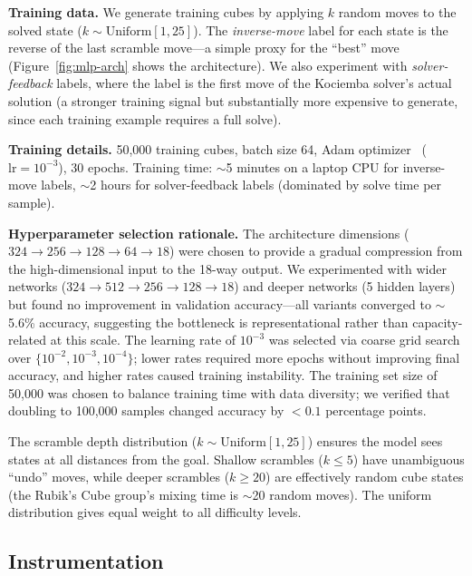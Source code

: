 \documentclass[conference]{IEEEtran}
\begin{document}
\textbf{Training data.} We generate training cubes by applying $k$ random moves to the solved state ($k \sim \text{Uniform}[1, 25]$). The \emph{inverse-move} label for each state is the reverse of the last scramble move---a simple proxy for the ``best'' move (Figure~\ref{fig:mlp-arch} shows the architecture). We also experiment with \emph{solver-feedback} labels, where the label is the first move of the Kociemba solver's actual solution (a stronger training signal but substantially more expensive to generate, since each training example requires a full solve).

\textbf{Training details.} 50,000 training cubes, batch size 64, Adam optimizer~\cite{kingma2015} ($\text{lr} = 10^{-3}$), 30 epochs. Training time: $\sim$5 minutes on a laptop CPU for inverse-move labels, $\sim$2 hours for solver-feedback labels (dominated by solve time per sample).

\textbf{Hyperparameter selection rationale.} The architecture dimensions ($324 \to 256 \to 128 \to 64 \to 18$) were chosen to provide a gradual compression from the high-dimensional input to the 18-way output. We experimented with wider networks ($324 \to 512 \to 256 \to 128 \to 18$) and deeper networks (5 hidden layers) but found no improvement in validation accuracy---all variants converged to $\sim$5.6\% accuracy, suggesting the bottleneck is representational rather than capacity-related at this scale. The learning rate of $10^{-3}$ was selected via coarse grid search over $\{10^{-2}, 10^{-3}, 10^{-4}\}$; lower rates required more epochs without improving final accuracy, and higher rates caused training instability. The training set size of 50,000 was chosen to balance training time with data diversity; we verified that doubling to 100,000 samples changed accuracy by $< 0.1$ percentage points.

The scramble depth distribution ($k \sim \text{Uniform}[1, 25]$) ensures the model sees states at all distances from the goal. Shallow scrambles ($k \leq 5$) have unambiguous ``undo'' moves, while deeper scrambles ($k \geq 20$) are effectively random cube states (the Rubik's Cube group's mixing time is $\sim$20 random moves). The uniform distribution gives equal weight to all difficulty levels.

\subsection{Instrumentation}
\label{sec:instrumentation}
\end{document}
